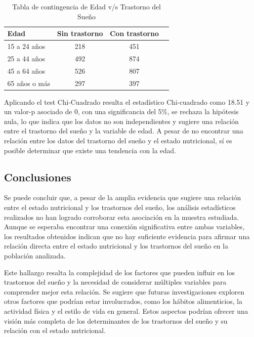 \documentclass[
  10pt,
  letterpaper,
  DIV=11,
  numbers=noendperiod,
  twocolumn]{scrartcl}
\begin{document}
\begin{table}[H]
  \centering
  \begin{tabular}{lccc}
    \toprule
    Edad & Sin trastorno & Con trastorno\\
    \midrule
    15 a 24 años  & 218 & 451 \\
    25 a 44 años  & 492 & 874 \\
    45 a 64 años  & 526 & 807 \\
    65 años o más & 297 & 397 \\
    \bottomrule
  \end{tabular}
  \caption{Tabla de contingencia de Edad v/s Trastorno del Sueño}
  
\end{table}

Aplicando el test Chi-Cuadrado resulta el estadístico Chi-cuadrado como
18.51 y un valor-p asociado de 0, con una significancia del 5\%, se
rechaza la hipótesis nula, lo que indica que los datos no son
independientes y sugiere una relación entre el trastorno del sueño y la
variable de edad. A pesar de no encontrar una relación entre los datos
del trastorno del sueño y el estado nutricional, sí es posible
determinar que existe una tendencia con la edad.

\hypertarget{conclusiones}{%
\subsection{Conclusiones}\label{conclusiones}}

Se puede concluir que, a pesar de la amplia evidencia que sugiere una
relación entre el estado nutricional y los trastornos del sueño, los
análisis estadísticos realizados no han logrado corroborar esta
asociación en la muestra estudiada. Aunque se esperaba encontrar una
conexión significativa entre ambas variables, los resultados obtenidos
indican que no hay suficiente evidencia para afirmar una relación
directa entre el estado nutricional y los trastornos del sueño en la
población analizada.

Este hallazgo resalta la complejidad de los factores que pueden influir
en los trastornos del sueño y la necesidad de considerar múltiples
variables para comprender mejor esta relación. Se sugiere que futuras
investigaciones exploren otros factores que podrían estar involucrados,
como los hábitos alimenticios, la actividad física y el estilo de vida
en general. Estos aspectos podrían ofrecer una visión más completa de
los determinantes de los trastornos del sueño y su relación con el
estado nutricional.
\end{document}
